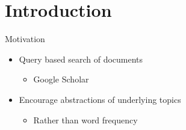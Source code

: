 \section{Introduction}

\begin{frame}{\insertsection}{Motivation}
    \begin{itemize}
        \item Query based search of documents
        \begin{itemize}
            \item Google Scholar
        \end{itemize}
        \item Encourage abstractions of underlying topics
        \begin{itemize}
            \item Rather than word frequency
        \end{itemize}
    \end{itemize}
\end{frame}



